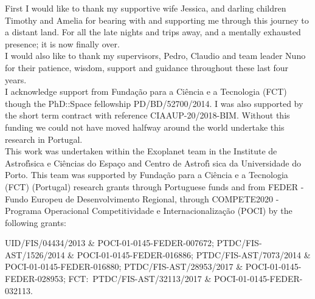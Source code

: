 
\begin{acknowledgements}
    \label{preface:acknowledgements}
    First I would like to thank my supportive wife Jessica, and darling children Timothy and Amelia for bearing with and supporting me through this journey to a distant land.
    For all the late nights and trips away, and a mentally exhausted presence; it is now finally over.\\
    
    I would also like to thank my supervisors, Pedro, Claudio and team leader Nuno for their patience, wisdom, support and guidance throughout these last four years.\\
    
    I acknowledge support from Funda\c{c}\~{a}o para a Ci\^encia e a Tecnologia (FCT) though the PhD::Space fellowship {PD/BD/52700/2014}.
    I was also supported by the short term contract with reference {CIAAUP-20/2018-BIM}.
    Without this funding we could not have moved halfway around the world undertake this research in Portugal.\\
    
    This work was undertaken within the Exoplanet team in the Institute de Astrof\'{\i}sica e Ci\^encias do Espa\c{c}o and Centro de Astrof\'{\i} sica da Universidade do Porto.
    This team was supported by Funda\c{c}\~ao para a Ci\^{e}ncia e a Tecnologia (FCT) (Portugal) research grants through Portuguese funds and from {FEDER} - Fundo Europeu de Desenvolvimento Regional, through {COMPETE2020} - Programa Operacional Competitividade e Internacionaliza\c{c}\~{a}o ({POCI}) by the following grants:

    {UID/FIS/04434/2013} \& {POCI-01-0145-FEDER-007672};
    {PTDC/FIS-AST/1526/2014} \& {POCI-01-0145-FEDER-016886};
    {PTDC/FIS-AST/7073/2014} \& {POCI-01-0145-FEDER-016880};
    {PTDC/FIS-AST/28953/2017} \& {POCI-01-0145-FEDER-028953};
    {FCT:~PTDC/FIS-AST/32113/2017} \& {POCI-01-0145-FEDER-032113}.

\end{acknowledgements}
